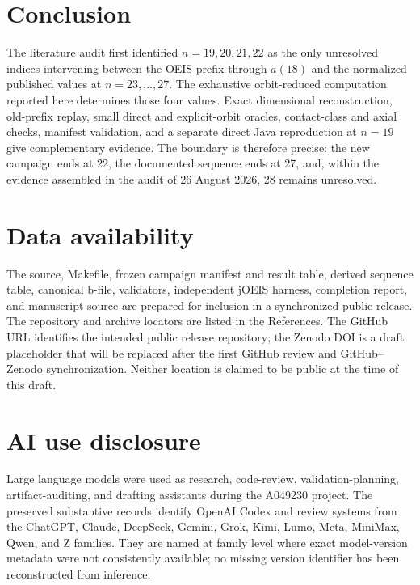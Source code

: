\documentclass[11pt]{article}
\theoremstyle{definition}
\theoremstyle{remark}
\begin{document}
\section{Conclusion}

The literature audit first identified $n=19,20,21,22$ as the only unresolved
indices intervening between the OEIS prefix through $a(18)$ and the normalized
published values at $n=23,\ldots,27$.  The exhaustive orbit-reduced computation
reported here determines those four values.  Exact dimensional reconstruction,
old-prefix replay, small direct and explicit-orbit oracles, contact-class and
axial checks, manifest validation, and a separate direct Java reproduction at
$n=19$ give complementary evidence.  The boundary is
therefore precise: the new campaign ends at 22, the documented sequence ends
at 27, and, within the evidence assembled in the audit of 26 August 2026, 28
remains unresolved.

\section*{Data availability}

The source, Makefile, frozen campaign manifest and result table, derived
sequence table, canonical b-file, validators, independent jOEIS harness,
completion report, and manuscript source are prepared for inclusion in a
synchronized public release.  The repository and archive locators are listed
in the References.  The GitHub URL identifies the intended public release
repository; the Zenodo DOI is a draft placeholder that will be replaced after
the first GitHub review and GitHub--Zenodo synchronization.  Neither location
is claimed to be public at the time of this draft.

\section*{AI use disclosure}

Large language models were used as research, code-review,
validation-planning, artifact-auditing, and drafting assistants during the
A049230 project.  The preserved substantive records identify OpenAI Codex and
review systems from the ChatGPT, Claude, DeepSeek, Gemini, Grok, Kimi, Lumo,
Meta, MiniMax, Qwen, and Z families.  They are named at family level where
exact model-version metadata were not consistently available; no missing
version identifier has been reconstructed from inference.
\end{document}
